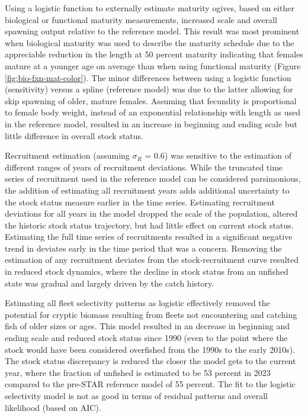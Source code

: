 \documentclass[11pt,
  letterpaper,
]{article}
\begin{document}
Using a logistic function to externally estimate maturity ogives, based on either biological or functional maturity measurements, increased scale and overall spawning output relative to the reference model. This result was most prominent when biological maturity was used to describe the maturity schedule due to the appreciable reduction in the length at 50 percent maturity indicating that females mature at a younger age on average than when using functional maturity (Figure \ref{fig:bio-fxn-mat-color}). The minor differences between using a logistic function (sensitivity) versus a spline (reference model) was due to the latter allowing for skip spawning of older, mature females. Assuming that fecundity is proportional to female body weight, instead of an exponential relationship with length as used in the reference model, resulted in an increase in beginning and ending scale but little difference in overall stock status.

Recruitment estimation (assuming \(\sigma_R\) = 0.6) was sensitive to the estimation of different ranges of years of recruitment deviations. While the truncated time series of recruitment used in the reference model can be considered parsimonious, the addition of estimating all recruitment years adds additional uncertainty to the stock status measure earlier in the time series. Estimating recruitment deviations for all years in the model dropped the scale of the population, altered the historic stock status trajectory, but had little effect on current stock status. Estimating the full time series of recruitments resulted in a significant negative trend in deviates early in the time period that was a concern. Removing the estimation of any recruitment deviates from the stock-recruitment curve resulted in reduced stock dynamics, where the decline in stock status from an unfished state was gradual and largely driven by the catch history.

Estimating all fleet selectivity patterns as logistic effectively removed the potential for cryptic biomass resulting from fleets not encountering and catching fish of older sizes or ages. This model resulted in an decrease in beginning and ending scale and reduced stock status since 1990 (even to the point where the stock would have been considered overfished from the 1990s to the early 2010s). The stock status discrepancy is reduced the closer the model gets to the current year, where the fraction of unfished is estimated to be 53 percent in 2023 compared to the pre-STAR reference model of 55 percent. The fit to the logistic selectivity model is not as good in terms of residual patterns and overall likelihood (based on AIC).
\end{document}
